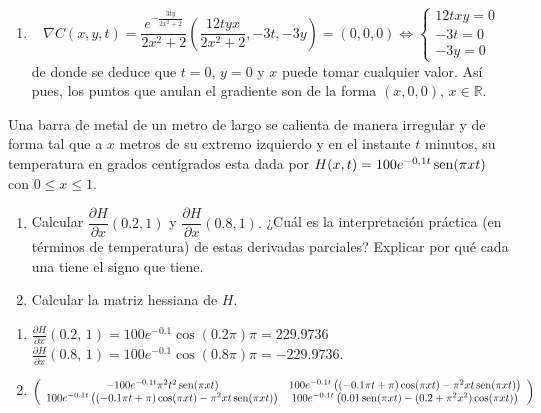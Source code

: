{\begin{enumerate}
\item 
\[
\nabla C(x,y,t) =\frac{e^{-\frac{3ty}{2x^2+2}}}{2x^2+2}\left(\frac{12tyx}{2x^2+2}, -3t, -3y\right) = (0,0,0) \Leftrightarrow 
\left\{
\begin{array}{l}
12txy =0 \\
-3t = 0\\
-3y = 0
\end{array}
\right.
\] 
de donde se deduce que $t=0$, $y=0$ y $x$ puede tomar cualquier valor. Así pues, los puntos que anulan el gradiente son de la forma $(x,0,0)$, $x\in\mathbb{R}$.
\end{enumerate}
}


{Una barra de metal de un metro de largo se calienta de manera irregular y de forma tal que a $x$ metros de su extremo izquierdo y en el instante $t$ minutos, su temperatura en grados centígrados esta dada por $H(x,t) = 100e^{-0.1t}\operatorname{sen}(\pi xt)$ con $0\leq x \leq 1$. 
\begin{enumerate}
\item Calcular $\dfrac{\partial H}{\partial x}(0.2, 1)$ y $\dfrac{\partial H}{\partial x}(0.8, 1).$ ¿Cuál es la interpretación práctica (en términos de temperatura) de estas derivadas parciales? Explicar por qué cada una tiene el signo que tiene.  
\item Calcular la matriz hessiana de $H$. 
\end{enumerate}
}
{\begin{enumerate}
\item $\frac{\partial H}{\partial x}(0.2,\, 1) = 100e^{-0.1}\cos(0.2\pi) \pi = 229.9736$ \\
$\frac{\partial H}{\partial x}(0.8,\, 1) = 100e^{-0.1}\cos(0.8\pi) \pi = -229.9736$.
\item $
\left(
\begin{array}{cc}
-100e^{-0.1t}\pi^2 t^2\operatorname{sen}(\pi xt) & 100e^{-0.1t}\left((-0.1\pi t+\pi)\cos(\pi xt) - \pi^2 xt \operatorname{sen}(\pi xt)\right) \\
100e^{-0.1t}\left((-0.1\pi t+\pi)\cos(\pi xt) - \pi^2 xt \operatorname{sen}(\pi xt)\right) & 100e^{-0.1t}\left(0.01\operatorname{sen}(\pi xt) -(0.2+\pi^2x^2) \cos(\pi xt)\right)
\end{array}
\right)$
\end{enumerate}
}
